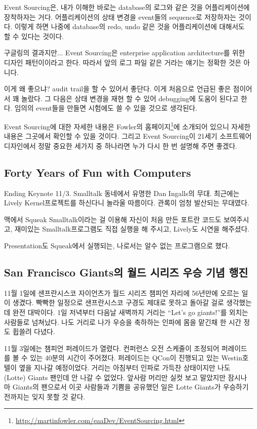 \documentclass[11pt]{article}
\begin{document}
Event Sourcing은, 내가 이해한 바로는 database의 로그와 같은 것을
어플리케이션에 장착하자는 거다. 어플리케이션의 상태 변경을 event들의
sequence로 저장하자는 것이다. 이렇게 하면 나중에 database의 redo, undo
같은 것을 어플리케이션에 대해서도 할 수 있다는 것이다.
 
구글링의 결과지만... Event Sourcing은 enterprise application
architecture를 위한 디자인 패턴이이라고 한다. 따라서 앞의 로그 파일
같은 거라는 얘기는 정확한 것은 아니다.
 
이게 왜 좋으냐? audit trail을 할 수 있어서 좋단다. 이게 처음으로 언급된
좋은 점이어서 꽤 놀랐다. 그 다음은 상태 변경을 재현 할 수 있어
debugging에 도움이 된다고 한다. 임의의 event들을 만들면 시험에도 쓸 수
있을 것으로 생각된다.
 
Event Sourcing에 대한 자세한 내용은 Fowler의 
홈페이지\footnote{\url{http://martinfowler.com/eaaDev/EventSourcing.html}}에 
소개되어 있으니 자세한 내용은 그곳에서 확인할 수 있을 것이다.
그리고 Event Sourcing이 21세기 소프트웨어 디자인에서 정말 중요한 세가지 중 
하나라면 누가 다시 한 번 설명해 주면 좋겠다.

\subsection{Forty Years of Fun with Computers}

Ending Keynote 11/3. Smalltalk 동네에서 유명한 Dan Ingalls의 무대.
최근에는 Lively Kernel프로젝트를 하신다니 놀라울 따름이다.
관록이 엄청 발산되는 무대였다.
 
맥에서 Squeak Smalltalk이라는 걸 이용해 자신이 처음 만든 포트란 코드도
보여주시고, 재미있는 Smalltalk프로그램도 직접 실행을 해 주시고,
Lively도 시연을 해주셨다.
 
Presentation도 Squeak에서 실행되는, 나로서는 알수 없는 프로그램으로 했다.

\subsection{San Francisco Giants의 월드 시리즈 우승 기념 행진}

11월 1일에 샌프란시스코 자이언츠가 월드 시리즈 챔피언 자리에
56년만에 오르는 일이 생겼다. 빡빡한 일정으로 샌프란시스코 구경도 제대로
못하고 돌아갈 걸로 생각했는데 완전 대박이다. 1일 저녁부터 다음날 새벽까지 
거리는 ``Let's go giants!''를 외치는 사람들로 넘쳐났다. 나도 거리로 나가
우승을 축하하는 인파에 몸을 맡긴채 한 시간 정도 휩쓸려 다녔다. 

11월 3일에는 챔피언 퍼레이드가 열렸다. 컨퍼런스 오전 스케줄이 조정되어 
퍼레이드를 볼 수 있는 40분의 시간이 주어졌다.  
퍼레이드는 QCon이 진행되고 있는 Westin호텔이 옆을 지나갈 예정이었다.
거리는 아침부터 인파로 가득찬 상태이지만 나도 (Lotte) Giants 팬인데 안
나갈 수 없었다. 앞사람 머리만 실컷 보고 말았지만 잠시나마 Giants의 팬으로서 
이곳 사람들과 기쁨을 공유했던 일은 Lotte Giants가 우승하기 전까지는 잊지
못할 것 같다.
\end{document}
